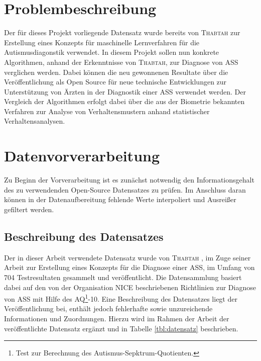 \documentclass[conference]{IEEEtran}
\begin{document}
\section{Problembeschreibung}
Der für dieses Projekt vorliegende Datensatz wurde bereits von \textsc{Thabtah} \cite{Thabtah2017, Thabtah2018} zur Erstellung eines Konzepts für maschinelle Lernverfahren für die Autismusdiagonstik verwendet.
In diesem Projekt sollen nun konkrete Algorithmen, anhand der Erkenntnisse von \textsc{Thabtah}, zur Diagnose von ASS verglichen werden. Dabei können die neu gewonnenen Resultate über die Veröffentlichung als Open Source für neue technische Entwicklungen zur Unterstützung von Ärzten in der Diagnostik einer ASS verwendet werden. Der Vergleich der Algorithmen erfolgt dabei über die aus der Biometrie bekannten Verfahren zur Analyse von Verhaltensmustern anhand statistischer Verhaltensanalysen.

\section{Datenvorverarbeitung}
Zu Beginn der Vorverarbeitung ist es zunächst notwendig den Informationsgehalt des zu verwendenden Open-Source Datensatzes zu prüfen. Im Anschluss daran können in der Datenaufbereitung fehlende Werte interpoliert und Ausreißer gefiltert werden.

\subsection{Beschreibung des Datensatzes}
Der in dieser Arbeit verwendete Datensatz wurde von \textsc{Thabtah} \cite{Thabtah2017, Thabtah}, im Zuge seiner Arbeit zur Erstellung eines Konzepts für die Diagnose einer ASS, im Umfang von 704 Testresultaten gesammelt und veröffentlicht. Die Datensammlung basiert dabei auf den von der Organisation \textsc{NICE} \cite{NICE2012} beschriebenen Richtlinien zur Diagnose von ASS mit Hilfe des AQ\footnote{\label{foot:3}Test zur Berechnung des Autismus-Sepktrum-Quotienten.}-10. Eine Beschreibung des Datensatzes liegt der Veröffentlichung bei, enthält jedoch fehlerhafte sowie unzureichende Informationen und Zuordnungen. Hierzu wird im Rahmen der Arbeit der veröffentlichte Datensatz ergänzt und in Tabelle \ref{tbl:datensatz} beschrieben.
\end{document}
